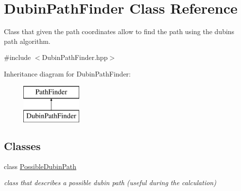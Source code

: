 \hypertarget{class_dubin_path_finder}{}\section{Dubin\+Path\+Finder Class Reference}
\label{class_dubin_path_finder}


Class that given the path coordinates allow to find the path using the dubins path algorithm.  




{\ttfamily \#include $<$Dubin\+Path\+Finder.\+hpp$>$}

Inheritance diagram for Dubin\+Path\+Finder\+:\begin{figure}[H]
\begin{center}
\leavevmode
\includegraphics[height=2.000000cm]{class_dubin_path_finder}
\end{center}
\end{figure}
\subsection*{Classes}
\begin{DoxyCompactItemize}
\item 
class \mbox{\hyperlink{class_dubin_path_finder_1_1_possible_dubin_path}{Possible\+Dubin\+Path}}
\begin{DoxyCompactList}\small\item\em class that describes a possible dubin path (useful during the calculation) \end{DoxyCompactList}\end{DoxyCompactItemize}
